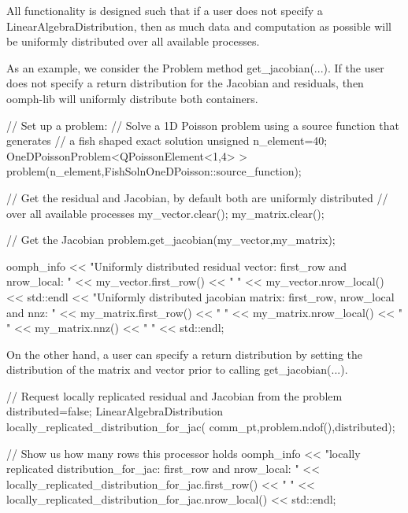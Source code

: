All functionality is designed such that if a user does not specify a {\ttfamily Linear\+Algebra\+Distribution}, then as much data and computation as possible will be uniformly distributed over all available processes.

As an example, we consider the {\ttfamily Problem} method {\ttfamily get\+\_\+jacobian}(...). If the user does not specify a return distribution for the Jacobian and residuals, then {\ttfamily oomph-\/lib} will uniformly distribute both containers.


\begin{DoxyCodeInclude}





  \textcolor{comment}{// Set up a problem: }
  \textcolor{comment}{// Solve a 1D Poisson problem using a source function that generates}
  \textcolor{comment}{// a fish shaped exact solution}
  \textcolor{keywordtype}{unsigned} n\_element=40; 
  OneDPoissonProblem<QPoissonElement<1,4> > 
   problem(n\_element,FishSolnOneDPoisson::source\_function);
    
  \textcolor{comment}{// Get the residual and Jacobian, by default both are uniformly distributed}
  \textcolor{comment}{// over all available processes}
  my\_vector.clear();
  my\_matrix.clear();
  
  \textcolor{comment}{// Get the Jacobian}
  problem.get\_jacobian(my\_vector,my\_matrix);
  
  oomph\_info 
   << \textcolor{stringliteral}{"Uniformly distributed residual vector: first\_row and nrow\_local: "} 
   << my\_vector.first\_row() << \textcolor{stringliteral}{" "} 
   << my\_vector.nrow\_local() << std::endl
   << \textcolor{stringliteral}{"Uniformly distributed jacobian matrix: first\_row, nrow\_local and nnz: "} 
   << my\_matrix.first\_row() << \textcolor{stringliteral}{" "} 
   << my\_matrix.nrow\_local() << \textcolor{stringliteral}{" "} 
   << my\_matrix.nnz() << \textcolor{stringliteral}{" "} 
   << std::endl;

\end{DoxyCodeInclude}


On the other hand, a user can specify a return distribution by setting the distribution of the matrix and vector prior to calling {\ttfamily get\+\_\+jacobian}(...).


\begin{DoxyCodeInclude}


  \textcolor{comment}{// Request locally replicated residual and Jacobian from the problem}
  distributed=\textcolor{keyword}{false};
  LinearAlgebraDistribution locally\_replicated\_distribution\_for\_jac(
   comm\_pt,problem.ndof(),distributed);
  
  \textcolor{comment}{// Show us how many rows this processor holds}
  oomph\_info 
   << \textcolor{stringliteral}{"locally replicated distribution\_for\_jac: first\_row and nrow\_local: "}
   << locally\_replicated\_distribution\_for\_jac.first\_row() << \textcolor{stringliteral}{" "} 
   << locally\_replicated\_distribution\_for\_jac.nrow\_local() 
   << std::endl;

\end{DoxyCodeInclude}


